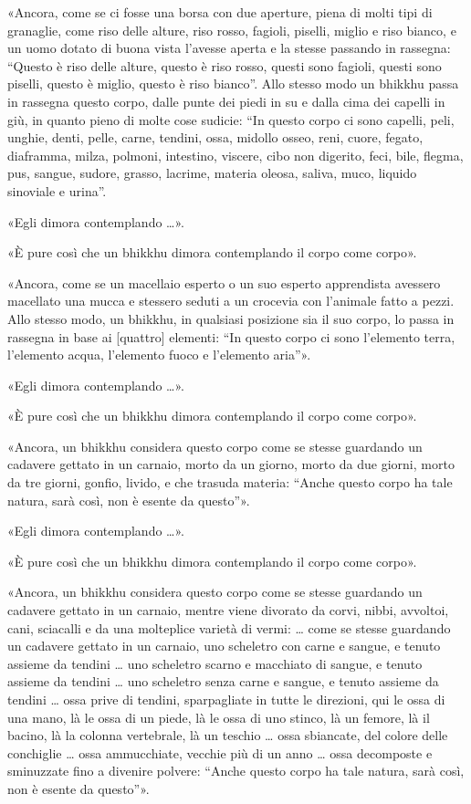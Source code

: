 %
«Ancora, come se ci fosse una borsa con due aperture, piena di molti tipi di
granaglie, come riso delle alture, riso rosso, fagioli, piselli, miglio e riso
bianco, e un uomo dotato di buona vista l’avesse aperta e la stesse passando in
rassegna: “Questo è riso delle alture, questo è riso rosso, questi sono fagioli,
questi sono piselli, questo è miglio, questo è riso bianco”. Allo stesso modo un
bhikkhu passa in rassegna questo corpo, dalle punte dei piedi in su e dalla cima
dei capelli in giù, in quanto pieno di molte cose sudicie: “In questo corpo ci
sono capelli, peli, unghie, denti, pelle, carne, tendini, ossa, midollo osseo,
reni, cuore, fegato, diaframma, milza, polmoni, intestino, viscere, cibo non
digerito, feci, bile, flegma, pus, sangue, sudore, grasso, lacrime, materia
oleosa, saliva, muco, liquido sinoviale e urina”.

«Egli dimora contemplando …».

«È pure così che un bhikkhu dimora contemplando il corpo come corpo».

«Ancora, come se un macellaio esperto o un suo esperto apprendista avessero
macellato una mucca e stessero seduti a un crocevia con l’animale fatto a pezzi.
Allo stesso modo, un bhikkhu, in qualsiasi posizione sia il suo corpo, lo passa
in rassegna in base ai [quattro] elementi: “In questo corpo ci sono l’elemento
terra, l’elemento acqua, l’elemento fuoco e l’elemento aria”».

«Egli dimora contemplando …».

«È pure così che un bhikkhu dimora contemplando il corpo come corpo».

\label{pag270}%
«Ancora, un bhikkhu considera questo corpo come se stesse guardando un cadavere
gettato in un carnaio, morto da un giorno, morto da due giorni, morto da tre
giorni, gonfio, livido, e che trasuda materia: “Anche questo corpo ha tale
natura, sarà così, non è esente da questo”».

«Egli dimora contemplando …».

«È pure così che un bhikkhu dimora contemplando il corpo come corpo».

«Ancora, un bhikkhu considera questo corpo come se stesse guardando un cadavere
gettato in un carnaio, mentre viene divorato da corvi, nibbi, avvoltoi, cani,
sciacalli e da una molteplice varietà di vermi: … come se stesse guardando un
cadavere gettato in un carnaio, uno scheletro con carne e sangue, e tenuto
assieme da tendini … uno scheletro scarno e macchiato di sangue, e tenuto
assieme da tendini … uno scheletro senza carne e sangue, e tenuto assieme da
tendini … ossa prive di tendini, sparpagliate in tutte le direzioni, qui le ossa
di una mano, là le ossa di un piede, là le ossa di uno stinco, là un femore, là
il bacino, là la colonna vertebrale, là un teschio … ossa sbiancate, del colore
delle conchiglie … ossa ammucchiate, vecchie più di un anno … ossa decomposte e
sminuzzate fino a divenire polvere: “Anche questo corpo ha tale natura, sarà
così, non è esente da questo”».

